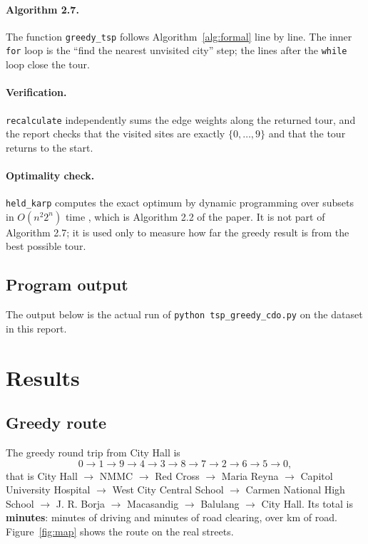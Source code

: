 \documentclass[11pt,a4paper]{article}
\begin{document}


\paragraph{Algorithm 2.7.} The function \texttt{greedy\_tsp} follows Algorithm~\ref{alg:formal} line by line. The inner \texttt{for} loop is the ``find the nearest unvisited city'' step; the lines after the \texttt{while} loop close the tour.



\paragraph{Verification.} \texttt{recalculate} independently sums the edge weights along the returned tour, and the report checks that the visited sites are exactly $\{0,\dots,9\}$ and that the tour returns to the start.

\paragraph{Optimality check.} \texttt{held\_karp} computes the exact optimum by dynamic programming over subsets in $O(n^2 2^n)$ time \cite{heldkarp1962}, which is Algorithm 2.2 of the paper. It is not part of Algorithm 2.7; it is used only to measure how far the greedy result is from the best possible tour.

\subsection{Program output}
The output below is the actual run of \texttt{python tsp\_greedy\_cdo.py} on the dataset in this report.


\section{Results}\label{sec:results}
\subsection{Greedy route}
The greedy round trip from City Hall is
\[
0 \to 1 \to 9 \to 4 \to 3 \to 8 \to 7 \to 2 \to 6 \to 5 \to 0,
\]
that is City Hall $\to$ NMMC $\to$ Red Cross $\to$ Maria Reyna $\to$ Capitol University Hospital $\to$ West City Central School $\to$ Carmen National High School $\to$ J. R. Borja $\to$ Macasandig $\to$ Balulang $\to$ City Hall. Its total is \textbf{\GreedyTotal{} minutes}: \GreedyTravel{} minutes of driving and \GreedyClear{} minutes of road clearing, over \GreedyKm{} km of road. Figure~\ref{fig:map} shows the route on the real streets.
\end{document}
